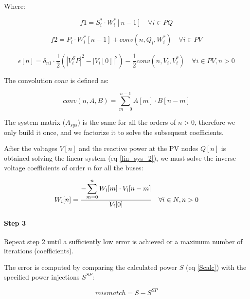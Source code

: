 \documentclass[nols,a4paper,twoside,symmetric,notoc,fleqn]{tufte-book}
\begin{document}
Where:

\begin{equation}
f1 = S^*_i \cdot W^*_i[n-1] \quad \forall i \in PQ
\end{equation}

\begin{equation}
f2 = P_i \cdot W^*_i[n-1] + conv(n, Q_i, W^*_i) \quad \forall i \in PV
\end{equation}

\begin{equation}
\epsilon[n] = \delta_{n1} \cdot \frac{1}{2} \left(|V_i^SP|^2 - |V_i[0]|^2\right) - \frac{1}{2} conv(n, V_i, V_i^*)  \quad \forall i \in PV, n > 0
\end{equation}


The convolution $conv$ is defined as:

\begin{equation}
conv(n, A, B) = \sum_{m=0}^{n-1} A[m] \cdot B[n-m]
\end{equation}

The system matrix ($A_{sys}$) is the same for all the orders of $n>0$, therefore we only build it once, and we factorize it to solve the subsequent coefficients.

After the voltages ${V}[n]$ and the reactive power at the PV nodes $Q[n]$ is obtained solving the linear system (eq \ref{lin_sys_2}), we must solve the inverse voltage coefficients of order $n$ for all the buses:

\begin{equation}
W_i[n] = \frac{- \mathlarger{\sum_{m=0}^{n}W_i[m] \cdot V_i[n-m]} }{V_i[0]} \quad  \forall i \in N, n>0
\end{equation}


\paragraph{Step 3}

Repeat step 2 until a sufficiently low error is achieved or a maximum number of iterations (coefficients).


The error is computed by comparing the calculated power ${S}$ (eq \ref{Scalc}) with the specified power injections ${S}^{SP}$:

\begin{equation}
mismatch = {S} - {S}^{SP}
\end{equation}
\end{document}
